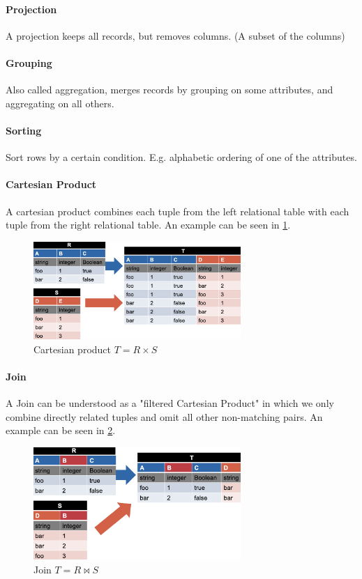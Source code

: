 \paragraph{Projection}
A projection keeps all records, but removes columns. (A subset of the columns)

\paragraph{Grouping}
Also called aggregation, merges records by grouping on some attributes, and aggregating on all others.

\paragraph{Sorting}
Sort rows by a certain condition. E.g. alphabetic ordering of one of the attributes.

\paragraph{Cartesian Product}
A cartesian product combines each tuple from the left relational table with each tuple from the right relational table. An example can be seen in \cref{fig:CartProd}.

\begin{figure}[h!]
    \centering
    \includegraphics[width=0.7\textwidth]{Figures/CartesianProduct.png}
    \caption{Cartesian product $T = R \times S$}\label{fig:CartProd}
\end{figure}

\paragraph{Join}
A Join can be understood as a "filtered Cartesian Product" in which we only combine directly related tuples and omit all other non-matching pairs. An example can be seen in \cref{fig:Join}.
\begin{figure}[h!]
    \centering
    \includegraphics[width=0.7\textwidth]{Figures/Join.png}
    \caption{Join $T = R \Join S$}\label{fig:Join}
\end{figure}


